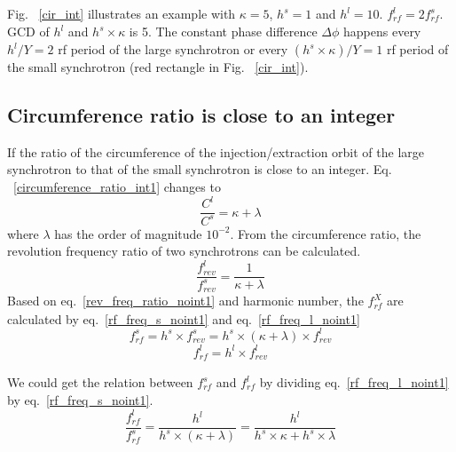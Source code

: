 Fig. ~\ref{cir_int} illustrates an example with $\kappa=5$, $h^s=1$ and $h^l=10$. $f_{\mathit{rf}}^{l}=2f_{\mathit{rf}}^{s}$. GCD of $h^l$ and $h^s \times \kappa$ is 5. The constant phase difference $\Delta\phi$ happens every ${h^l/Y}=2$ rf period of the large synchrotron or every ${(h^s\times \kappa)/Y}=1$ rf period of the small synchrotron (red rectangle in Fig. ~\ref{cir_int}). 

\subsection{Circumference ratio is close to an integer}
\label{sec:cir_close_an_int}
If the ratio of the circumference of the injection/extraction orbit of the large synchrotron to that of the small synchrotron is close to an integer. Eq. ~\ref{circumference_ratio_int1} changes to 
\begin{equation}
\frac{C^l}{C^s}= \kappa + \lambda \label{circumference_ratio_noint0}
\end{equation}
where $\lambda$ has the order of magnitude $10^{-2}$. From the circumference ratio, the revolution frequency ratio of two synchrotrons can be calculated.
\begin{equation}
\frac{f_{\mathit{rev}}^{l}}{f_{\mathit{rev}}^{s}}=\frac{1}{ \kappa+ \lambda} \label{rev_freq_ratio_noint1}
\end{equation}
Based on eq.~\ref{rev_freq_ratio_noint1} and harmonic number, the $f_{\mathit{rf}}^{X}$ are calculated by eq.~\ref{rf_freq_s_noint1} and eq.~\ref{rf_freq_l_noint1}
\begin{equation} 
f_{\mathit{rf}}^{s}= h^s \times f_{\mathit{rev}}^{s}=h^s \times ( \kappa+ \lambda) \times f_{\mathit{rev}}^{l} \label{rf_freq_s_noint1}
\end{equation}
\begin{equation} 
f_{\mathit{rf}}^{l}= h^l \times f_{\mathit{rev}}^{l} \label{rf_freq_l_noint1}
\end{equation}

We could get the relation between $f_{\mathit{rf}}^{s}$ and $f_{\mathit{rf}}^{l}$ by dividing eq.~\ref{rf_freq_l_noint1} by eq.~\ref{rf_freq_s_noint1}.
\begin{equation} 
\frac{f_{\mathit{rf}}^{l}}{f_{\mathit{rf}}^{s}}=\frac{h^l}{h^s \times ( \kappa+ \lambda)}=\frac{h^l}{h^s \times  \kappa+ h^s \times \lambda}\label{close_to_interger_31}
\end{equation}

